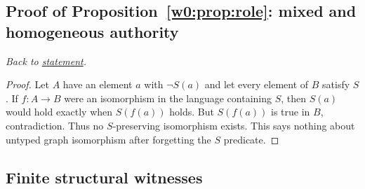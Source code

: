 \documentclass[11pt,letterpaper]{article}
\theoremstyle{definition}\newtheorem{definition}[theorem]{Definition}\newtheorem{example}[theorem]{Example}
\theoremstyle{remark}\newtheorem{remark}[theorem]{Remark}
\begin{document}
\subsection{Proof of Proposition~\ref{w0:prop:role}: mixed and homogeneous authority}\label{w0:pr:role}
\textit{Back to \hyperref[w0:prop:role]{statement}.}
\begin{proof}
Let $A$ have an element $a$ with $\neg S(a)$ and let every element of $B$ satisfy $S$. If $f:A\to B$ were an isomorphism in the language containing $S$, then $S(a)$ would hold exactly when $S(f(a))$ holds. But $S(f(a))$ is true in $B$, contradiction. Thus no $S$-preserving isomorphism exists. This says nothing about untyped graph isomorphism after forgetting the $S$ predicate.
\end{proof}


\subsection*{Finite structural witnesses}
\end{document}
